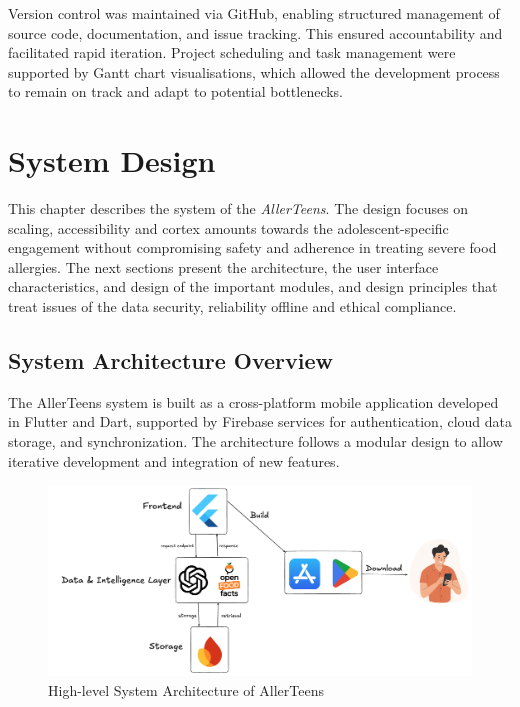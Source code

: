 \documentclass[MScCS]{uccthesis}
\begin{document}
Version control was maintained via GitHub, enabling structured management of source code, documentation, and issue tracking. This ensured accountability and facilitated rapid iteration. Project scheduling and task management were supported by Gantt chart visualisations, which allowed the development process to remain on track and adapt to potential bottlenecks.
\clearpage


\chapter{System Design}

This chapter describes the system of the \textit{AllerTeens}. The design focuses on scaling, accessibility and cortex amounts towards the adolescent-specific engagement without compromising safety and adherence in treating severe food allergies. The next sections present the architecture, the user interface characteristics, and design of the important modules, and design principles that treat issues of the data security, reliability offline and ethical compliance.

\section{System Architecture Overview}
The AllerTeens system is built as a cross-platform mobile application developed in Flutter and Dart, supported by Firebase services for authentication, cloud data storage, and synchronization. The architecture follows a modular design to allow iterative development and integration of new features.

\begin{figure}[htbp]
    \centering
    \includegraphics[width=\textwidth]{Figures/high_level_system_architecture.png}
    \caption{High-level System Architecture of AllerTeens}
    \label{fig:system-architecture}
\end{figure}
\end{document}
